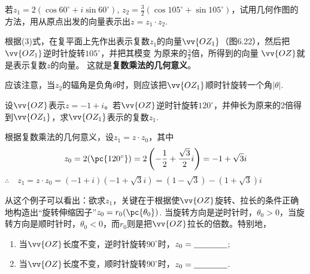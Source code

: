 \begin{example}
    若$z_1=2(\cos60^{\circ}+i\sin60^{\circ})$, $z_2=\frac{3}{2}(\cos105^{\circ}+
\sin105^{\circ})$，试用几何作图的方法，用从原点出发的向量表示出$z=z_1\cdot z_2$.
\end{example}


\noindent
\begin{minipage}{.5\textwidth}
    \CTEXindent
\begin{solution}
根据(3)式，在复平面上先作出表示复数$z_1$的向量$\vv{OZ_1}$（图6.22），然后把$\vv{OZ_1}$逆时针旋转$105^{\circ}$，并把其模变
为原来的$\frac{3}{2}$倍，所得到的向量
$\vv{OZ}$就是表示复数$z$的向量。
这就是\textbf{复数乘法的几何意义}。

应该注意，当$z_2$的辐角是负角$\theta$时，则应该把$\vv{OZ_1}$顺时针旋转一个角$|\theta|$.
\end{solution}    
\end{minipage}\hfill
\begin{minipage}{.45\textwidth}
\centering
{}
\end{minipage}   


\begin{example}
    设$\vv{OZ}$表示$z=-1+i$。若$\vv{OZ}$逆时针旋转$120^{\circ}$，并伸长为原来的2倍得到$\vv{OZ_1}$，求$\vv{OZ_1}$表示的复数$z_1$.
\end{example}

\begin{solution}
    根据复数乘法的几何意义，设$z_1=z\cdot z_0$，其中
\[z_0=2(\pc{120^{\circ}})=2\left(-\frac{1}{2}+\frac{\sqrt{3}}{2}i\right)=-1+\sqrt{3}i\]
$\therefore\quad z_1=z\cdot z_0=(-1+i)\left(-1+\sqrt{3}i\right)=\left(1-\sqrt{3}\right)-\left(1+\sqrt{3}\right)i$
\end{solution}

\begin{rmk}
    从这个例子可以看出：欲求$z_1$，关键在于根据使$\vv{OZ}$旋转、拉长的条件正确地构造出“旋转伸缩因子”$z_0=r_0(\pc{\theta_0})$. 当旋转方向是逆时针时，$\theta_0>0$，当旋转方向是顺时针时，$\theta_0<0$，而$r_0$则是把$\vv{OZ}$拉长的倍数。特别地，
\begin{enumerate}[(1)]
\item 当$\vv{OZ}$长度不变，逆时针旋转$90^{\circ}$时，$z_0=\underline{\qquad}\underline{\qquad}$;
\item 当$\vv{OZ}$长度不变，顺时针旋转$90^{\circ}$时，$z_0=\underline{\qquad}\underline{\qquad}$.
\end{enumerate}
\end{rmk}

